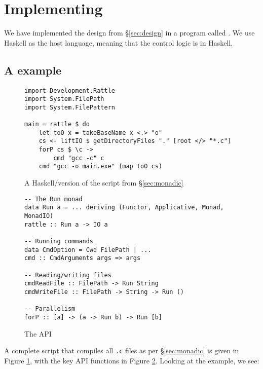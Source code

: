 \section{Implementing \Rattle}
\label{sec:implementation}

We have implemented the design from \S\ref{sec:design} in a program called \Rattle. We use Haskell as the host language, meaning that the control logic is in Haskell.

\subsection{A \Rattle example}

\begin{figure}
\begin{verbatim}
import Development.Rattle
import System.FilePath
import System.FilePattern

main = rattle $ do
    let toO x = takeBaseName x <.> "o"
    cs <- liftIO $ getDirectoryFiles "." [root </> "*.c"]
    forP cs $ \c ->
        cmd "gcc -c" c
    cmd "gcc -o main.exe" (map toO cs)
\end{verbatim}
\caption{A Haskell/\Rattle version of the script from \S\ref{sec:monadic}}
\label{fig:rattle_example}
\end{figure}

\begin{figure}
\begin{verbatim}
-- The Run monad
data Run a = ... deriving (Functor, Applicative, Monad, MonadIO)
rattle :: Run a -> IO a

-- Running commands
data CmdOption = Cwd FilePath | ...
cmd :: CmdArguments args => args

-- Reading/writing files
cmdReadFile :: FilePath -> Run String
cmdWriteFile :: FilePath -> String -> Run ()

-- Parallelism
forP :: [a] -> (a -> Run b) -> Run [b]
\end{verbatim}
\caption{The \Rattle API}
\label{fig:api}
\end{figure}

A complete \Rattle script that compiles all \texttt{.c} files as per \S\ref{sec:monadic} is given in Figure \ref{fig:rattle_example}, with the key API functions in Figure \ref{fig:api}. Looking at the example, we see:


